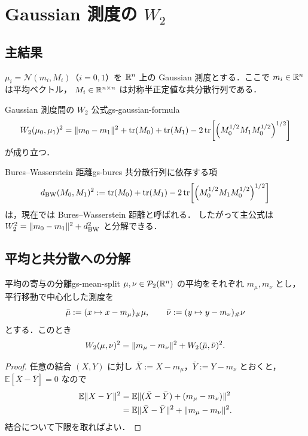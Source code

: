 \chapter{Gaussian 測度の \texorpdfstring{$W_2$}{W2}}
\label{ch:gaussian-measures}

\section{主結果}
\label{sec:gaussian-main-result}

$\mu_i=\mathcal{N}(m_i,M_i)$（$i=0,1$）を
$\mathbb{R}^n$ 上の Gaussian 測度とする．ここで
$m_i\in\mathbb{R}^n$ は平均ベクトル，
$M_i\in\mathbb{R}^{n\times n}$ は対称半正定値な共分散行列である．

\begin{theorem}{Gaussian 測度間の $W_2$ 公式}{gs-gaussian-formula}
  \[
    W_2(\mu_0,\mu_1)^2
    =
    \lVert m_0-m_1 \rVert^2
    +\operatorname{tr}(M_0)+\operatorname{tr}(M_1)
    -2\operatorname{tr}\!\left[
      \left(
        M_0^{1/2}M_1M_0^{1/2}
      \right)^{1/2}
    \right]
  \]
  が成り立つ．
\end{theorem}

\begin{remark}{Bures–Wasserstein 距離}{gs-bures}
  共分散行列に依存する項
  \[
    d_{\mathrm{BW}}(M_0,M_1)^2
    :=
    \operatorname{tr}(M_0)+\operatorname{tr}(M_1)
    -2\operatorname{tr}\!\left[
      \left(
        M_0^{1/2}M_1M_0^{1/2}
      \right)^{1/2}
    \right]
  \]
  は，現在では Bures–Wasserstein 距離と呼ばれる．
  したがって主公式は
  $W_2^2=\lVert m_0-m_1 \rVert^2+d_{\mathrm{BW}}^2$ と分解できる．
\end{remark}

\section{平均と共分散への分解}
\label{sec:mean-covariance-split}

\begin{lemma}{平均の寄与の分離}{gs-mean-split}
  $\mu,\nu\in\mathcal{P}_{2}(\mathbb{R}^n)$ の平均をそれぞれ $m_\mu,m_\nu$ とし，
  平行移動で中心化した測度を
  \[
    \bar{\mu}:=(x\mapsto x-m_\mu)_\#\mu,
    \qquad
    \bar{\nu}:=(y\mapsto y-m_\nu)_\#\nu
  \]
  とする．このとき
  \[
    W_2(\mu,\nu)^2
    =
    \lVert m_\mu-m_\nu \rVert^2
    +
    W_2(\bar{\mu},\bar{\nu})^2.
  \]
\end{lemma}

\begin{proof}
  任意の結合 $(X,Y)$ に対し
  $\bar X:=X-m_\mu$，$\bar Y:=Y-m_\nu$ とおくと，
  $\mathbb{E}[\bar X-\bar Y]=0$ なので
  \[
    \begin{aligned}
      \mathbb{E}\lVert X-Y \rVert^2
      &=
      \mathbb{E}\lVert 
        (\bar X-\bar Y)+(m_\mu-m_\nu)
       \rVert^2 \\
      &=
      \mathbb{E}\lVert \bar X-\bar Y \rVert^2
      +\lVert m_\mu-m_\nu \rVert^2.
    \end{aligned}
  \]
  結合について下限を取ればよい．
\end{proof}

